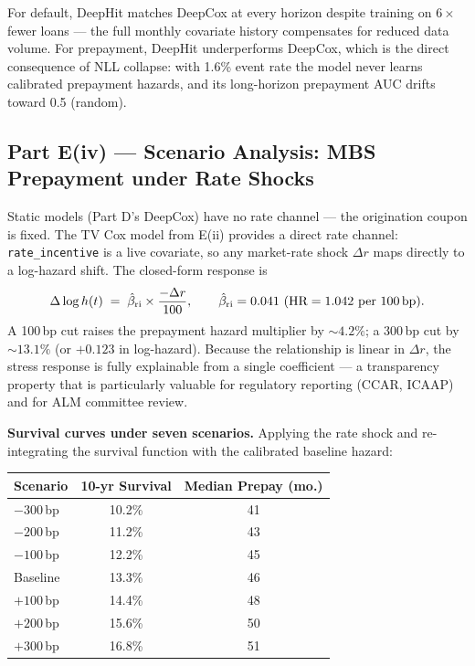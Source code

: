 \documentclass[11pt,a4paper]{article}
\begin{document}
For default, DeepHit matches DeepCox at every horizon despite training on $6\times$ fewer loans --- the full monthly covariate history compensates for reduced data volume. For prepayment, DeepHit underperforms DeepCox, which is the direct consequence of NLL collapse: with 1.6\% event rate the model never learns calibrated prepayment hazards, and its long-horizon prepayment AUC drifts toward 0.5 (random).

\subsection{Part E(iv) --- Scenario Analysis: MBS Prepayment under Rate Shocks}

Static models (Part D's DeepCox) have no rate channel --- the origination coupon is fixed. The TV Cox model from E(ii) provides a direct rate channel: \texttt{rate\_incentive} is a live covariate, so any market-rate shock $\Delta r$ maps directly to a log-hazard shift. The closed-form response is
\[
  \Delta \log h(t) \;=\; \hat\beta_{\text{ri}} \times \frac{-\Delta r}{100},
  \qquad \hat\beta_{\text{ri}} = 0.041 \text{ (HR} = 1.042 \text{ per 100\,bp)}.
\]
A 100\,bp cut raises the prepayment hazard multiplier by $\sim 4.2\%$; a 300\,bp cut by $\sim 13.1\%$ (or $+0.123$ in log-hazard). Because the relationship is linear in $\Delta r$, the stress response is fully explainable from a single coefficient --- a transparency property that is particularly valuable for regulatory reporting (CCAR, ICAAP) and for ALM committee review.

\textbf{Survival curves under seven scenarios.} Applying the rate shock and re-integrating the survival function with the calibrated baseline hazard:

\begin{center}
  \small
  \begin{tabular}{lcc}
    \toprule
    Scenario   & 10-yr Survival & Median Prepay (mo.) \\
    \midrule
    $-300$\,bp & 10.2\%         & 41                  \\
    $-200$\,bp & 11.2\%         & 43                  \\
    $-100$\,bp & 12.2\%         & 45                  \\
    Baseline   & 13.3\%         & 46                  \\
    $+100$\,bp & 14.4\%         & 48                  \\
    $+200$\,bp & 15.6\%         & 50                  \\
    $+300$\,bp & 16.8\%         & 51                  \\
    \bottomrule
  \end{tabular}
\end{center}
\end{document}
